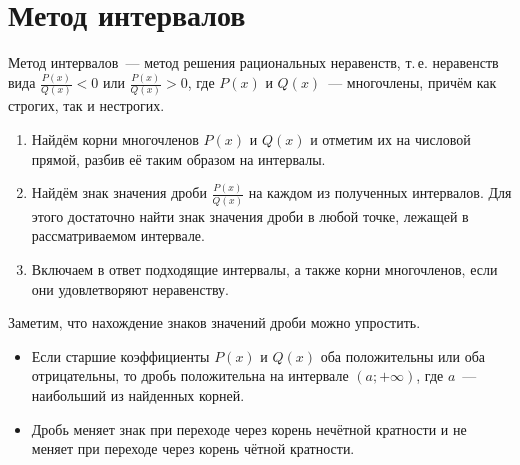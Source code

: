 \section{Метод интервалов}
 Метод интервалов~--- метод решения рациональных неравенств, т.\,е. неравенств вида $\frac{P(x)}{Q(x)} < 0$ или $\frac{P(x)}{Q(x)} > 0$, где $P(x)$ и $Q(x)$~--- многочлены, причём как строгих, так и нестрогих.
\begin{enumerate}
	\item Найдём корни многочленов $P(x)$ и $Q(x)$ и отметим их на числовой прямой, разбив её таким образом на интервалы.
	\item Найдём знак значения дроби $\frac{P(x)}{Q(x)}$ на каждом из полученных интервалов.
	Для этого достаточно найти знак значения дроби в любой точке, лежащей в рассматриваемом интервале.
	\item Включаем в ответ подходящие интервалы, а также корни многочленов, если они удовлетворяют неравенству.
\end{enumerate}

Заметим, что нахождение знаков значений дроби можно упростить.
\begin{itemize}
	\item Если старшие коэффициенты $P(x)$ и $Q(x)$ оба положительны или оба отрицательны, то дробь положительна на интервале $(a; +\infty)$, где $a$~--- наибольший из найденных корней.
	\item Дробь меняет знак при переходе через корень нечётной кратности и не меняет при переходе через корень чётной кратности.
\end{itemize}